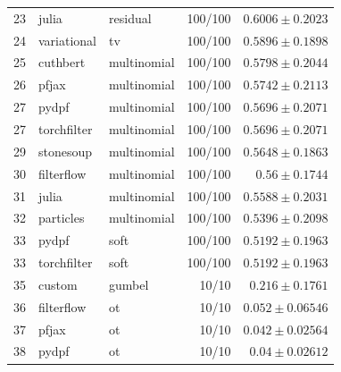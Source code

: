 \begin{table}[!htbp]
\begin{tabular}{rllrr}
23 & julia & residual & 100/100 & $0.6006 \pm 0.2023$ \\
24 & variational & tv & 100/100 & $0.5896 \pm 0.1898$ \\
25 & cuthbert & multinomial & 100/100 & $0.5798 \pm 0.2044$ \\
26 & pfjax & multinomial & 100/100 & $0.5742 \pm 0.2113$ \\
27 & pydpf & multinomial & 100/100 & $0.5696 \pm 0.2071$ \\
27 & torchfilter & multinomial & 100/100 & $0.5696 \pm 0.2071$ \\
29 & stonesoup & multinomial & 100/100 & $0.5648 \pm 0.1863$ \\
30 & filterflow & multinomial & 100/100 & $0.56 \pm 0.1744$ \\
31 & julia & multinomial & 100/100 & $0.5588 \pm 0.2031$ \\
32 & particles & multinomial & 100/100 & $0.5396 \pm 0.2098$ \\
33 & pydpf & soft & 100/100 & $0.5192 \pm 0.1963$ \\
33 & torchfilter & soft & 100/100 & $0.5192 \pm 0.1963$ \\
35 & custom & gumbel & 10/10 & $0.216 \pm 0.1761$ \\
36 & filterflow & ot & 10/10 & $0.052 \pm 0.06546$ \\
37 & pfjax & ot & 10/10 & $0.042 \pm 0.02564$ \\
38 & pydpf & ot & 10/10 & $0.04 \pm 0.02612$ \\
\bottomrule
\end{tabular}
\end{table}

